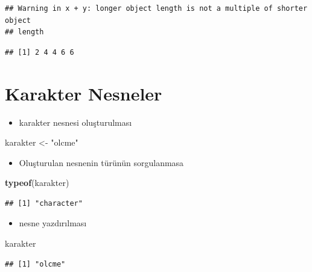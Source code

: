 \documentclass[
  oneside]{book}
\newenvironment{Shaded}{\begin{snugshade}}{\end{snugshade}}
\newcommand{\FunctionTok}[1]{\textcolor[rgb]{0.13,0.29,0.53}{\textbf{#1}}}
\newcommand{\NormalTok}[1]{#1}
\newcommand{\OtherTok}[1]{\textcolor[rgb]{0.56,0.35,0.01}{#1}}
\newcommand{\StringTok}[1]{\textcolor[rgb]{0.31,0.60,0.02}{#1}}
\providecommand{\tightlist}{%
  \setlength{\itemsep}{0pt}\setlength{\parskip}{0pt}}
\begin{document}
\begin{verbatim}
## Warning in x + y: longer object length is not a multiple of shorter object
## length
\end{verbatim}

\begin{verbatim}
## [1] 2 4 4 6 6
\end{verbatim}

\hypertarget{karakter-nesneler}{%
\section{Karakter Nesneler}\label{karakter-nesneler}}

\begin{itemize}
\tightlist
\item
  karakter nesnesi oluşturulması
\end{itemize}

\begin{Shaded}
\begin{Highlighting}[]
\NormalTok{karakter }\OtherTok{\textless{}{-}} \StringTok{"olcme"}
\end{Highlighting}
\end{Shaded}

\begin{itemize}
\tightlist
\item
  Oluşturulan nesnenin türünün sorgulanmasa
\end{itemize}

\begin{Shaded}
\begin{Highlighting}[]
\FunctionTok{typeof}\NormalTok{(karakter)}
\end{Highlighting}
\end{Shaded}

\begin{verbatim}
## [1] "character"
\end{verbatim}

\begin{itemize}
\tightlist
\item
  nesne yazdırılması
\end{itemize}

\begin{Shaded}
\begin{Highlighting}[]
\NormalTok{karakter}
\end{Highlighting}
\end{Shaded}

\begin{verbatim}
## [1] "olcme"
\end{verbatim}
\end{document}
